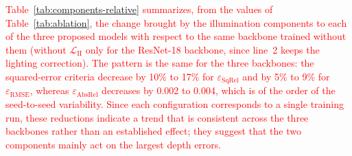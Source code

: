 \documentclass[a4paper,fleqn]{cas-dc}
\begin{document}
%
\textcolor{red}{ Table~\ref{tab:components-relative} summarizes, from the values of Table~\ref{tab:ablation}, the change brought by the illumination components to each of the three proposed models with respect to the same backbone trained without them (without $\mathcal{L}_\textrm{II}$ only for the ResNet-18 backbone, since line~2 keeps the lighting correction). The pattern is the same for the three backbones: the squared-error criteria decrease by 10\% to 17\% for $\varepsilon_\textrm{SqRel}$ and by 5\% to 9\% for $\varepsilon_\textrm{RMSE}$, whereas $\varepsilon_\textrm{AbsRel}$ decreases by 0.002 to 0.004, which is of the order of the seed-to-seed variability. Since each configuration corresponds to a single training run, these reductions indicate a trend that is consistent across the three backbones rather than an established effect; they suggest that the two components mainly act on the largest depth errors.}
\end{document}
